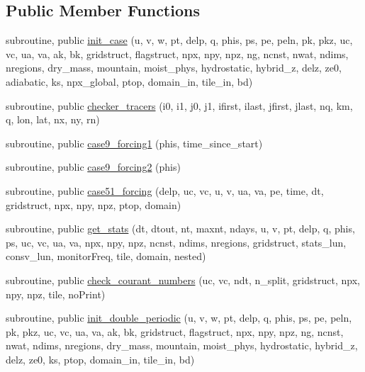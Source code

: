 \subsection*{Public Member Functions}
\begin{DoxyCompactItemize}
\item 
subroutine, public \hyperlink{classtest__cases__mod_a986f9f679bcd73e158def56cd9848054}{init\-\_\-case} (u, v, w, pt, delp, q, phis, ps, pe, peln, pk, pkz, uc, vc, ua, va, ak, bk, gridstruct, flagstruct, npx, npy, npz, ng, ncnst, nwat, ndims, nregions, dry\-\_\-mass, mountain, moist\-\_\-phys, hydrostatic, hybrid\-\_\-z, delz, ze0, adiabatic, ks, npx\-\_\-global, ptop, domain\-\_\-in, tile\-\_\-in, bd)
\item 
subroutine, public \hyperlink{classtest__cases__mod_a18ab30d706b11164805c0fa06712936e}{checker\-\_\-tracers} (i0, i1, j0, j1, ifirst, ilast, jfirst, jlast, nq, km, q, lon, lat, nx, ny, rn)
\item 
subroutine, public \hyperlink{classtest__cases__mod_a414d587d54e2c2143eb92518ab122d13}{case9\-\_\-forcing1} (phis, time\-\_\-since\-\_\-start)
\item 
subroutine, public \hyperlink{classtest__cases__mod_ad714385ec571796ea76f467ebc71bfea}{case9\-\_\-forcing2} (phis)
\item 
subroutine, public \hyperlink{classtest__cases__mod_a17ad15ded2b36408f1d991d07bab3aa6}{case51\-\_\-forcing} (delp, uc, vc, u, v, ua, va, pe, time, dt, gridstruct, npx, npy, npz, ptop, domain)
\item 
subroutine, public \hyperlink{classtest__cases__mod_aa69b4104347ae690d3aa71f8d8a2a276}{get\-\_\-stats} (dt, dtout, nt, maxnt, ndays, u, v, pt, delp, q, phis, ps, uc, vc, ua, va, npx, npy, npz, ncnst, ndims, nregions, gridstruct, stats\-\_\-lun, consv\-\_\-lun, monitor\-Freq, tile, domain, nested)
\item 
subroutine, public \hyperlink{classtest__cases__mod_aa93bb608b6adac92ae4ee22132926e29}{check\-\_\-courant\-\_\-numbers} (uc, vc, ndt, n\-\_\-split, gridstruct, npx, npy, npz, tile, no\-Print)
\item 
subroutine, public \hyperlink{classtest__cases__mod_afe098f0f0a16a14e3e59312a69374b9e}{init\-\_\-double\-\_\-periodic} (u, v, w, pt, delp, q, phis, ps, pe, peln, pk, pkz, uc, vc, ua, va, ak, bk, gridstruct, flagstruct, npx, npy, npz, ng, ncnst, nwat, ndims, nregions, dry\-\_\-mass, mountain, moist\-\_\-phys, hydrostatic, hybrid\-\_\-z, delz, ze0, ks, ptop, domain\-\_\-in, tile\-\_\-in, bd)
\item 

\end{DoxyCompactItemize}
